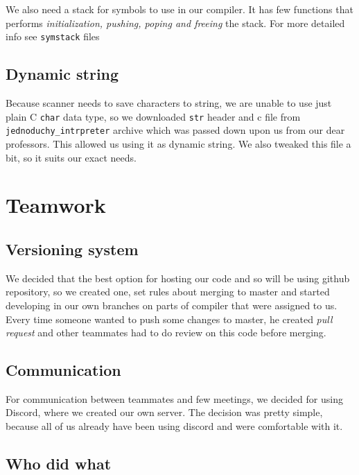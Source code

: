 \documentclass[11pt, titlepage]{article}
\begin{document}
We also need a stack for symbols to use in our compiler. It has few
functions that performs \emph{initialization, pushing, poping and
freeing} the stack. For more detailed info see \texttt{symstack}
files

\subsection{Dynamic string}\label{dynamic-string}

Because scanner needs to save characters to string, we are unable to use
just plain C \texttt{char} data type, so we downloaded \texttt{str}
header and c file from \texttt{jednoduchy\_intrpreter} archive which was
passed down upon us from our dear professors. This allowed us using it as
dynamic string. We also tweaked this file a bit, so it suits our exact needs.




\section{Teamwork}\label{teamwork}

\subsection{Versioning system}\label{versioning-system}

We decided that the best option for hosting our code and so will be
using github repository, so we created one, set rules about merging to
master and started developing in our own branches on parts of compiler
that were assigned to us. Every time someone wanted to push some changes
to master, he created \emph{pull request} and other teammates had to do
review on this code before merging.

\subsection{Communication}\label{communication}

For communication between teammates and few meetings, we decided for
using Discord, where we created our own server. The decision was pretty
simple, because all of us already have been using discord and were
comfortable with it.

\subsection{Who did what}\label{who-did-what}
\end{document}

